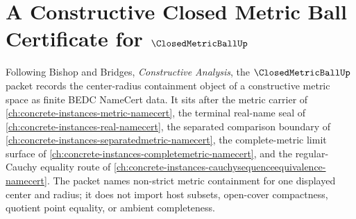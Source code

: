 \chapter{A Constructive Closed Metric Ball Certificate for $\ClosedMetricBallUp$}
\label{ch:concrete-instances-closed-metric-ball-namecert}

Following Bishop and Bridges, \emph{Constructive Analysis}, the $\ClosedMetricBallUp$ packet records the center-radius containment object of a constructive metric space as finite BEDC NameCert data. It sits after the metric carrier of \autoref{ch:concrete-instances-metric-namecert}, the terminal real-name seal of \autoref{ch:concrete-instances-real-namecert}, the separated comparison boundary of \autoref{ch:concrete-instances-separatedmetric-namecert}, the complete-metric limit surface of \autoref{ch:concrete-instances-completemetric-namecert}, and the regular-Cauchy equality route of \autoref{ch:concrete-instances-cauchysequenceequivalence-namecert}. The packet names non-strict metric containment for one displayed center and radius; it does not import host subsets, open-cover compactness, quotient point equality, or ambient completeness.


